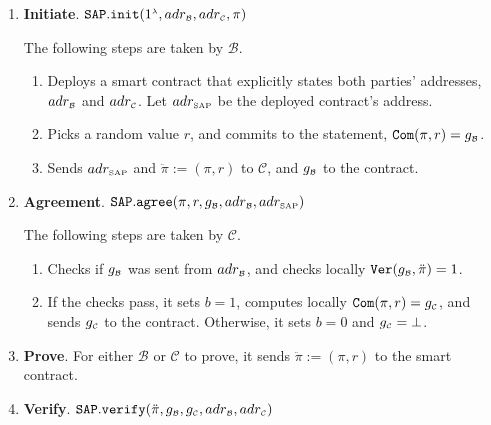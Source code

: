 %
 \begin{enumerate}
 \item\textbf{Initiate}. $\mathtt{SAP.init}(1^{\scriptscriptstyle\lambda}, adr_{\scriptscriptstyle\mathcal{B}}, adr_{\scriptscriptstyle\mathcal{C}}, \pi )$ 

 The following steps are taken   by  $\mathcal B$.
 
  \begin{enumerate}
  \item\label{SAP::deploy-contract}  Deploys a smart contract that  explicitly states both parties'  addresses, $adr_{\scriptscriptstyle\mathcal{B}}$ and  $adr_{\scriptscriptstyle\mathcal{C}}$. Let $adr_{\scriptscriptstyle\text{SAP}}$ be the deployed contract's address. 

   \item  Picks a random value $r$, and commits to the statement, $\mathtt{Com}(\pi, r)=g_{\scriptscriptstyle \mathcal{B}}$.
   \item Sends $adr_{\scriptscriptstyle\text{SAP}}$ and $\ddot{\pi}:=(\pi, r)$  to  $\mathcal C$, and $g_{\scriptscriptstyle\mathcal B}$ to the contract. 
    \end{enumerate}
    \item\textbf{Agreement}. $\mathtt{SAP.agree}(\pi, r, g_{\scriptscriptstyle \mathcal{B}}, adr_{\scriptscriptstyle\mathcal{B}}, adr_{\scriptscriptstyle\text{SAP}})$

     The following steps are taken   by  $\mathcal C$.
     \begin{enumerate}
   \item Checks  if $g_{\scriptscriptstyle \mathcal{B}}$ was  sent  from $adr_{\scriptscriptstyle \mathcal{B}}$, and checks locally $\mathtt{Ver}(g_{\scriptscriptstyle\mathcal B}, \ddot{\pi})=1$.
   \item If the checks pass, it sets $b=1$,    computes locally $\mathtt{Com}(\pi, r)=g_{\scriptscriptstyle\mathcal C}$, and sends $g_{\scriptscriptstyle\mathcal C}$ to the contract. Otherwise, it sets $b=0$ and $g_{\scriptscriptstyle\mathcal C}=\bot$.
    \end{enumerate}
     
     
     
   \item\textbf{Prove}. For either $\mathcal B$ or $\mathcal C$ to prove, it sends $\ddot{\pi}:=(\pi, r)$  to the smart contract. 
   
   
   
 \item\textbf{Verify}. $\mathtt{SAP.verify}(\ddot{\pi}, g_{\scriptscriptstyle\mathcal B},g_{\scriptscriptstyle\mathcal C}, adr_{\scriptscriptstyle\mathcal{B}}, adr_{\scriptscriptstyle\mathcal{C}})$
 

\end{enumerate}
